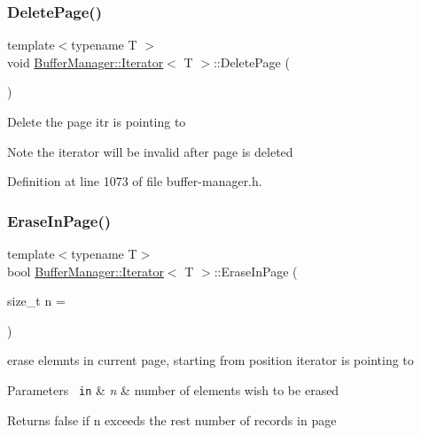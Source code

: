 \subsubsection{\texorpdfstring{DeletePage()}{DeletePage()}}
{\footnotesize\ttfamily template$<$typename T $>$ \\
void \mbox{\hyperlink{class_buffer_manager_1_1_iterator}{Buffer\+Manager\+::\+Iterator}}$<$ T $>$\+::Delete\+Page (\begin{DoxyParamCaption}{ }\end{DoxyParamCaption})\hspace{0.3cm}{\ttfamily [inline]}}

Delete the page itr is pointing to \begin{DoxyNote}{Note}
the iterator will be invalid after page is deleted 
\end{DoxyNote}


Definition at line 1073 of file buffer-\/manager.\+h.

\mbox{\label{class_buffer_manager_1_1_iterator_a2c627998f19999fe55b7452b840ce47b}} 
\subsubsection{\texorpdfstring{EraseInPage()}{EraseInPage()}}
{\footnotesize\ttfamily template$<$typename T$>$ \\
bool \mbox{\hyperlink{class_buffer_manager_1_1_iterator}{Buffer\+Manager\+::\+Iterator}}$<$ T $>$\+::Erase\+In\+Page (\begin{DoxyParamCaption}\item[{size\+\_\+t}]{n = {} }\end{DoxyParamCaption})\hspace{0.3cm}{\ttfamily [inline]}}

erase elemnts in current page, starting from position iterator is pointing to 
\begin{DoxyParams}[1]{Parameters}
\mbox{\texttt{ in}}  & {\em n} & number of elements wish to be erased \\
\hline
\end{DoxyParams}
\begin{DoxyReturn}{Returns}
false if {\ttfamily n} exceeds the rest number of records in page 
\end{DoxyReturn}


